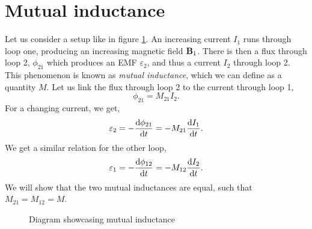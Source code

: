 \documentclass{book}
\begin{document}
\section{Mutual inductance}
Let us consider a setup like in figure \ref{fig:mutualinductance}. An increasing current $I_1$ runs through loop one, producing an increasing magnetic field $\vb{B}_1$. There is then a flux through loop 2, $\phi_{21}$ which produces an EMF $\varepsilon_2$, and thus a current $I_2$ through loop 2. This phenomenon is known as \textit{mutual inductance}, which we can define as a quantity $M$. Let us link the flux through loop 2 to the current through loop 1,
\begin{equation}
	\phi_{21} = M_{21}I_2.
\end{equation}
For a changing current, we get,
\begin{equation}
	\varepsilon_2 = - \dv{\phi_{21}}{t} = -M_{21}\dv{I_1}{t}.
\end{equation}
We get a similar relation for the other loop,
\begin{equation}
	\varepsilon_1 = - \dv{\phi_{12}}{t} = -M_{12}\dv{I_2}{t}.
\end{equation}
We will show that the two mutual inductances are equal, such that $M_{21} = M_{12} = M$.
\begin{figure}
	\centering
	\caption{Diagram showcasing mutual inductance}
	\label{fig:mutualinductance}
\end{figure}
\\\\
\end{document}
